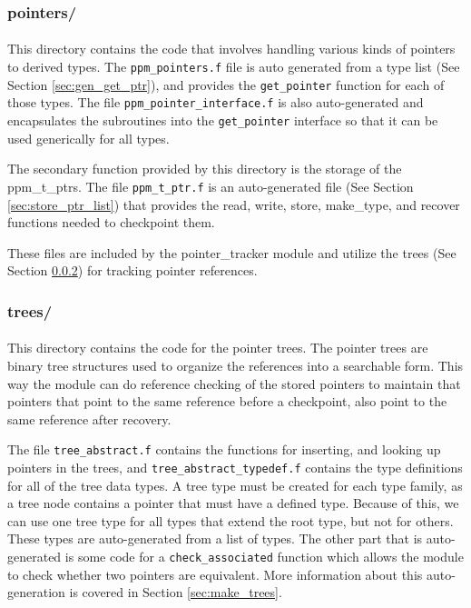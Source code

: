\documentclass{article}
\begin{document}
\subsubsection{pointers/}
\label{sec:dirpointers}
\paragraph{}
This directory contains the code that involves handling various kinds of pointers to derived types. The \texttt{ppm\_pointers.f} file is auto generated from a type list (See Section \ref{sec:gen_get_ptr}), and provides the \texttt{get\_pointer} function for each of those types. The file \texttt{ppm\_pointer\_interface.f} is also auto-generated and encapsulates the subroutines into the \texttt{get\_pointer} interface so that it can be used generically for all types.

The secondary function provided by this directory is the storage of the ppm\_t\_ptrs. The file \texttt{ppm\_t\_ptr.f} is an auto-generated file (See Section \ref{sec:store_ptr_list}) that provides the read, write, store, make\_type, and recover functions needed to checkpoint them.

These files are included by the pointer\_tracker module and utilize the trees (See Section \ref{sec:dirtrees}) for tracking pointer references.

\subsubsection{trees/}
\label{sec:dirtrees}
\paragraph{}
This directory contains the code for the pointer trees. The pointer trees are binary tree structures used to organize the references into a searchable form. This way the module can do reference checking of the stored pointers to maintain that pointers that point to the same reference before a checkpoint, also point to the same reference after recovery.

The file \texttt{tree\_abstract.f} contains the functions for inserting, and looking up pointers in the trees, and \texttt{tree\_abstract\_typedef.f} contains the type definitions for all of the tree data types. A tree type must be created for each type family, as a tree node contains a pointer that must have a defined type. Because of this, we can use one tree type for all types that extend the root type, but not for others. These types are auto-generated from a list of types. The other part that is auto-generated is some code for a \texttt{check\_associated} function which allows the module to check whether two pointers are equivalent. More information about this auto-generation is covered in Section \ref{sec:make_trees}.
\end{document}
